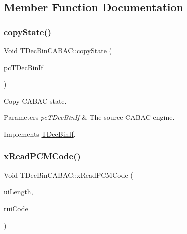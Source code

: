 \subsection{Member Function Documentation}
\mbox{\label{class_t_dec_bin_c_a_b_a_c_a6e127d13b329c85af6998d4e29b8761a}} 
\subsubsection{\texorpdfstring{copy\+State()}{copyState()}}
{\footnotesize\ttfamily Void T\+Dec\+Bin\+C\+A\+B\+A\+C\+::copy\+State (\begin{DoxyParamCaption}\item[{const \hyperlink{class_t_dec_bin_if}{T\+Dec\+Bin\+If} $\ast$}]{pc\+T\+Dec\+Bin\+If }\end{DoxyParamCaption})\hspace{0.3cm}{\ttfamily [virtual]}}


\begin{DoxyItemize}
\item Copy C\+A\+B\+AC state.
\end{DoxyItemize}
\begin{DoxyParams}{Parameters}
{\em pc\+T\+Dec\+Bin\+If} & The source C\+A\+B\+AC engine. \\
\hline
\end{DoxyParams}


Implements \hyperlink{class_t_dec_bin_if}{T\+Dec\+Bin\+If}.

\mbox{\label{class_t_dec_bin_c_a_b_a_c_a530860731da7f12e0c92e379c1d21dc1}} 
\subsubsection{\texorpdfstring{x\+Read\+P\+C\+M\+Code()}{xReadPCMCode()}}
{\footnotesize\ttfamily Void T\+Dec\+Bin\+C\+A\+B\+A\+C\+::x\+Read\+P\+C\+M\+Code (\begin{DoxyParamCaption}\item[{U\+Int}]{ui\+Length,  }\item[{U\+Int \&}]{rui\+Code }\end{DoxyParamCaption})\hspace{0.3cm}{\ttfamily [virtual]}}

